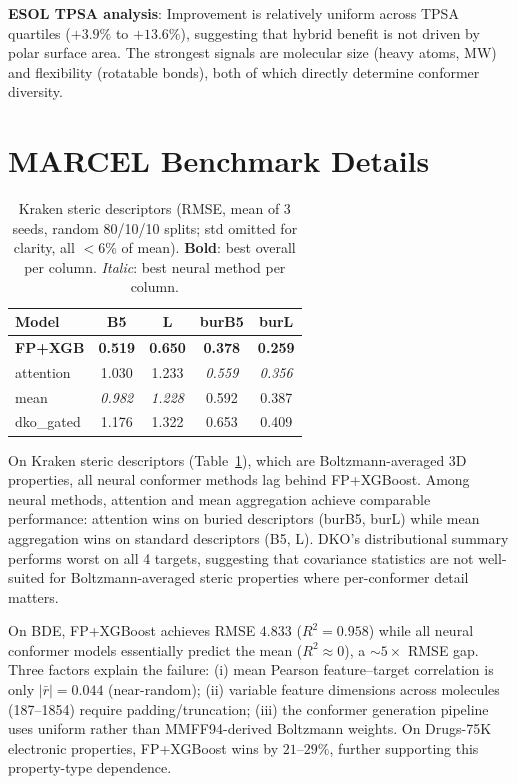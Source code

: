\documentclass[sigconf]{acmart}
\begin{document}
\textbf{ESOL TPSA analysis}: Improvement is relatively uniform across TPSA quartiles ($+3.9\%$ to $+13.6\%$), suggesting that hybrid benefit is not driven by polar surface area. The strongest signals are molecular size (heavy atoms, MW) and flexibility (rotatable bonds), both of which directly determine conformer diversity.

\section{MARCEL Benchmark Details}
\label{app:marcel}

\begin{table}[ht]
\caption{Kraken steric descriptors (RMSE, mean of 3 seeds, random 80/10/10 splits; std omitted for clarity, all $<$6\% of mean). \textbf{Bold}: best overall per column. \textit{Italic}: best neural method per column.}
\label{tab:kraken}
\centering
\small
\begin{tabular}{@{}lcccc@{}}
\toprule
Model & B5 & L & burB5 & burL \\
\midrule
\textbf{FP+XGB}   & \textbf{0.519} & \textbf{0.650} & \textbf{0.378} & \textbf{0.259} \\
\midrule
attention     & 1.030 & 1.233 & \textit{0.559} & \textit{0.356} \\
mean          & \textit{0.982} & \textit{1.228} & 0.592 & 0.387 \\
dko\_gated    & 1.176 & 1.322 & 0.653 & 0.409 \\
\bottomrule
\end{tabular}
\end{table}

On Kraken steric descriptors (Table~\ref{tab:kraken}), which are Boltzmann-averaged 3D properties, all neural conformer methods lag behind FP+XGBoost. Among neural methods, attention and mean aggregation achieve comparable performance: attention wins on buried descriptors (burB5, burL) while mean aggregation wins on standard descriptors (B5, L). DKO's distributional summary performs worst on all 4 targets, suggesting that covariance statistics are not well-suited for Boltzmann-averaged steric properties where per-conformer detail matters.

On BDE, FP+XGBoost achieves RMSE $4.833$ ($R^2 = 0.958$) while all neural conformer models essentially predict the mean ($R^2 \approx 0$), a ${\sim}5\times$ RMSE gap. Three factors explain the failure: (i) mean Pearson feature--target correlation is only $|\bar{r}| = 0.044$ (near-random); (ii) variable feature dimensions across molecules (187--1854) require padding/truncation; (iii) the conformer generation pipeline uses uniform rather than MMFF94-derived Boltzmann weights. On Drugs-75K electronic properties, FP+XGBoost wins by $21$--$29\%$, further supporting this property-type dependence.
\end{document}
